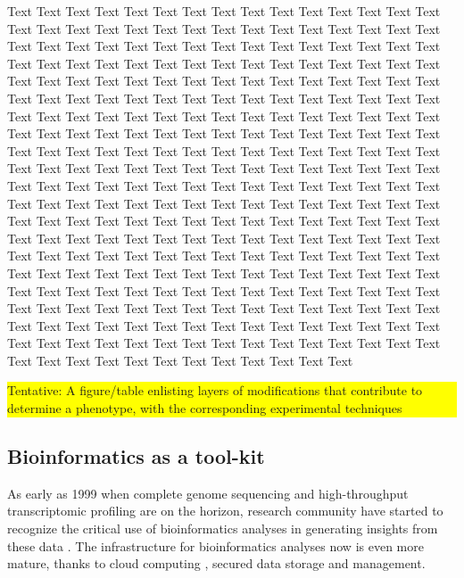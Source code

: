 \documentclass[letter]{bioinfo}
\newcommand{\todo}[1]{\colorbox{yellow}{\parbox{1\linewidth}{#1}}}
\begin{document}
Text Text Text Text Text Text  Text Text Text Text Text Text Text Text  Text Text Text Text Text Text Text Text  Text Text Text Text Text Text Text Text  Text Text Text Text Text Text Text Text  Text Text Text Text Text Text Text Text  Text Text Text Text Text Text Text Text  Text Text Text Text Text Text Text Text  Text Text Text Text Text Text Text Text  Text Text Text Text Text Text Text Text  Text Text Text Text Text Text Text Text  Text Text Text Text Text Text Text Text  Text Text Text Text Text Text Text Text  Text Text Text Text Text Text Text Text  Text Text Text Text Text Text Text Text  Text Text Text Text Text Text Text Text  Text Text Text Text Text Text Text Text  Text Text Text Text Text Text Text Text  Text Text Text Text Text Text Text Text  Text Text Text Text Text Text Text Text  Text Text Text Text Text Text Text Text  Text Text Text Text Text Text Text Text  Text Text Text Text Text Text Text Text  Text Text Text Text Text Text Text Text  Text Text Text Text Text Text Text Text  Text Text Text Text Text Text Text Text  Text Text Text Text Text Text Text Text  Text Text Text Text Text Text Text Text  Text Text Text Text Text Text Text Text  Text Text Text Text Text Text Text Text  Text Text Text Text Text Text Text Text  Text Text Text Text Text Text Text Text  Text Text Text Text Text Text Text Text  Text Text Text Text Text Text Text Text  Text Text Text Text Text Text Text Text  Text Text Text Text Text Text Text Text  Text Text Text Text Text Text Text Text  Text Text Text Text Text Text Text Text  Text Text Text Text Text Text Text Text  Text Text 
%
\todo{Tentative: A figure/table enlisting layers of modifications that contribute to determine a phenotype, with the corresponding experimental techniques}
%
%
\subsection{Bioinformatics as a tool-kit}

As early as 1999 when complete genome sequencing and high-throughput transcriptomic profiling are on the horizon, research community have started to recognize the critical use of bioinformatics analyses in generating insights from these data \citep{Claverie:1999:Computational}.
The infrastructure for bioinformatics analyses now is even more mature, thanks to cloud computing \citep{Langmead:2018:Cloud}, secured data storage and management.
\end{document}

